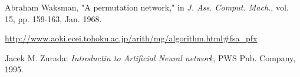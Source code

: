 {\begin{thebibliography}{}



 Abraham Waksman, "A permutation network," in {\em J. Ass. Comput. Mach.}, vol. 15, pp. 159-163, Jan. 1968.




 \url{http://www.aoki.ecei.tohoku.ac.jp/arith/mg/algorithm.html#fsa_pfx}




 Jacek M. Zurada: {\em Introductin to Artificial Neural network}, PWS Pub. Company, 1995.





\end{thebibliography}

} 